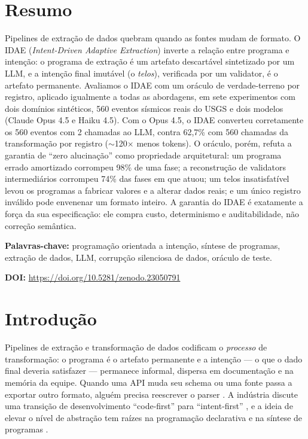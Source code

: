 \documentclass[sigconf,nonacm]{acmart}
\begin{document}

\frenchspacing
\maketitle

\section*{Resumo}
Pipelines de extração de dados quebram quando as fontes mudam de formato. O IDAE (\textit{Intent-Driven Adaptive Extraction}) inverte a relação entre programa e intenção: o programa de extração é um artefato descartável sintetizado por um LLM, e a intenção final imutável (o \textit{telos}), verificada por um validator, é o artefato permanente. Avaliamos o IDAE com um oráculo de verdade-terreno por registro, aplicado igualmente a todas as abordagens, em sete experimentos com dois domínios sintéticos, 560 eventos sísmicos reais do USGS e dois modelos (Claude Opus 4.5 e Haiku 4.5). Com o Opus 4.5, o IDAE converteu corretamente os 560 eventos com 2 chamadas ao LLM, contra 62,7\% com 560 chamadas da transformação por registro ($\sim$120$\times$ menos tokens). O oráculo, porém, refuta a garantia de ``zero alucinação'' como propriedade arquitetural: um programa errado amortizado corrompeu 98\% de uma fase; a reconstrução de validators intermediários corrompeu 74\% das fases em que atuou; um telos insatisfatível levou os programas a fabricar valores e a alterar dados reais; e um único registro inválido pode envenenar um formato inteiro. A garantia do IDAE é exatamente a força da sua especificação: ele compra custo, determinismo e auditabilidade, não correção semântica.

\textbf{Palavras-chave:} programação orientada a intenção, síntese de programas, extração de dados, LLM, corrupção silenciosa de dados, oráculo de teste.

\noindent\textbf{DOI:} \url{https://doi.org/10.5281/zenodo.23050791}

\section{Introdução}

Pipelines de extração e transformação de dados codificam o \textit{processo} de transformação: o programa é o artefato permanente e a intenção --- o que o dado final deveria satisfazer --- permanece informal, dispersa em documentação e na memória da equipe. Quando uma API muda seu schema ou uma fonte passa a exportar outro formato, alguém precisa reescrever o parser \cite{salehie2009self}. A indústria discute uma transição de desenvolvimento ``code-first'' para ``intent-first'' \cite{shoukry2026future}, e a ideia de elevar o nível de abstração tem raízes na programação declarativa \cite{lloyd1994practical} e na síntese de programas \cite{gulwani2017program}.
\end{document}
